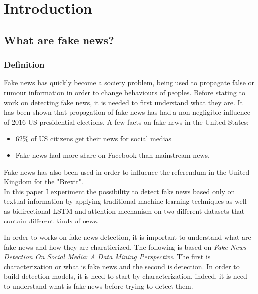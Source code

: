 \chapter{Introduction} \label{section:intro}
\section{What are fake news?}
\subsection{Definition}
Fake news has quickly become a society problem, being used to propagate false or rumour information in order to change behaviours of peoples. Before stating to work on detecting fake news, it is needed to first understand what they are. It has been shown that propagation of fake news has had a non-negligible influence of 2016 US presidential elections\cite{Allcott2017}. A few facts on fake news in the United States: 

\begin{itemize}
 \item $62\%$ of US citizens get their news for social medias\cite{gottfried2016news}
 \item Fake news had more share on Facebook than mainstream news\cite{silverman2016teens}.
\end{itemize}

Fake news has also been used in order to influence the referendum in the United Kingdom for the "Brexit". \\

In this paper I experiment the possibility to detect fake news based only on textual information by applying traditional machine learning techniques\cite{Fan2008LIBLINEARAL,Robertson2004,zhang_optimality_nodate} as well as bidirectional-LSTM\cite{Hochreiter1997LongSM} and attention mechanism\cite{zhou-etal-2016-attention} on two different datasets that contain different kinds of news.

In order to works on fake news detection, it is important to understand what are fake news and how they are charatierized. The following is based on \textit{Fake News Detection On Social Media: A Data Mining Perspective}\cite{shu2017fake}.
The first is characterization or what is fake news and the second is detection. In order to build detection models, it is need to start by characterization, indeed, it is need to understand what is fake news before trying to detect them. \\

